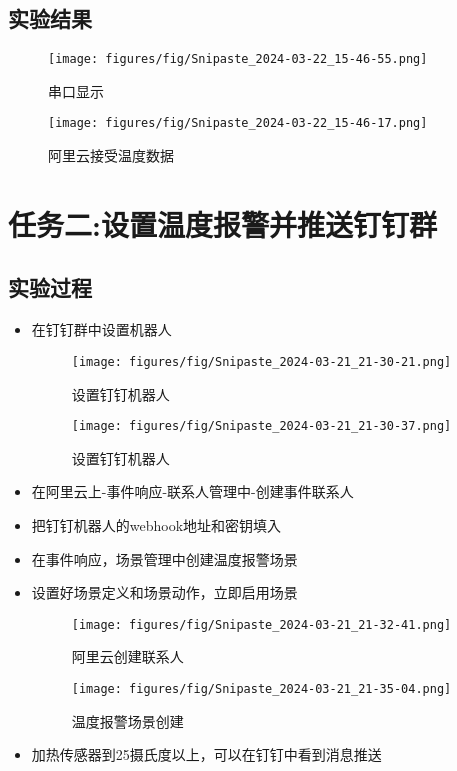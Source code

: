 \documentclass[12pt,hyperref,a4paper,UTF8]{ctexart}
\begin{document}
\subsection{实验结果}
\begin{figure}[H]
    \centering
    \texttt{[image: figures/fig/Snipaste\_2024-03-22\_15-46-55.png]}
    \caption{串口显示}
    \label{fig:enter-label}
\end{figure}
\begin{figure}[H]
    \centering
    \texttt{[image: figures/fig/Snipaste\_2024-03-22\_15-46-17.png]}
    \caption{阿里云接受温度数据}
    \label{fig:enter-label}
\end{figure}




\section{任务二:设置温度报警并推送钉钉群}

\subsection{实验过程}
\begin{itemize}[]
    \item 在钉钉群中设置机器人
    \begin{figure}[H]
        \centering
        \begin{minipage}{0.45\textwidth}
            \centering
            \texttt{[image: figures/fig/Snipaste\_2024-03-21\_21-30-21.png]}
            \caption{设置钉钉机器人}
            \label{fig:enter-label1}
        \end{minipage}\hfill
        \begin{minipage}{0.45\textwidth}
            \centering
            \texttt{[image: figures/fig/Snipaste\_2024-03-21\_21-30-37.png]}
            \caption{设置钉钉机器人}
            \label{fig:enter-label2}
        \end{minipage}
    \end{figure}

    \item 在阿里云上-事件响应-联系人管理中-创建事件联系人
    \item 把钉钉机器人的webhook地址和密钥填入
    \item 在事件响应，场景管理中创建温度报警场景
    \item 设置好场景定义和场景动作，立即启用场景
    \begin{figure}[H]
        \centering
        \texttt{[image: figures/fig/Snipaste\_2024-03-21\_21-32-41.png]}
        \caption{阿里云创建联系人}
        \label{fig:enter-label}
    \end{figure} 
    \begin{figure}[H]
        \centering
        \texttt{[image: figures/fig/Snipaste\_2024-03-21\_21-35-04.png]}
        \caption{温度报警场景创建}
        \label{fig:enter-label}
    \end{figure} 
    \item 加热传感器到25摄氏度以上，可以在钉钉中看到消息推送
\end{itemize}
\end{document}
